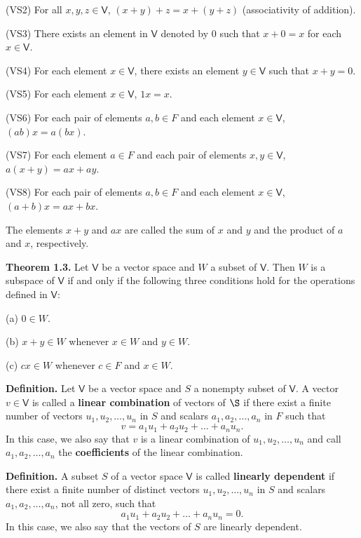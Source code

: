 \documentclass{article}
\newcommand{\0}{\mathit{0}}
\begin{document}
(VS2) For all $x, y, z \in \mathsf{V}$, $(x + y) + z = x + (y + z)$
(associativity of addition).

(VS3) There exists an element in $\mathsf{V}$ denoted by $\0$ such that
$x + \0 = x$ for each $x \in \mathsf{V}$.

(VS4) For each element $x \in \mathsf{V}$, there exists an element
$y \in \mathsf{V}$ such that $x + y = \0$.

(VS5) For each element $x \in \mathsf{V}$, $1x = x$.

(VS6) For each pair of elements $a, b \in F$ and each element
$x \in \mathsf{V}$, $(ab)x = a(bx)$.

(VS7) For each element $a \in F$ and each pair of elements
$x, y \in \mathsf{V}$, $a(x + y) = ax + ay$.

(VS8) For each pair of elements $a, b \in F$ and each element
$x \in \mathsf{V}$, $(a + b)x = ax + bx$.

The elements $x + y$ and $ax$ are called the sum of $x$ and $y$ and the
product of $a$ and $x$, respectively.

\medskip

\textbf{Theorem 1.3.}
Let $\mathsf{V}$ be a vector space and $W$ a subset of
$\mathsf{V}$. Then $W$ is a subspace of $\mathsf{V}$ if and
only if the following three conditions hold for the operations
defined in $\mathsf{V}$:

(a) $\0 \in W$.

(b) $x + y \in W$ whenever $x \in W$ and $y \in W$.

(c) $c x \in W$ whenever $c \in F$ and $x \in W$.

\medskip

\textbf{Definition.}
Let $\mathsf{V}$ be a vector space and $S$ a nonempty subset of
$\mathsf{V}$. A vector $v \in \mathsf{V}$ is called a \textbf{linear combination}
of vectors of $\S$ if there exist a finite number of vectors
$u_1, u_2, \dots, u_n$ in $S$ and scalars $a_1, a_2, \dots, a_n$
in $F$ such that
\[
    v = a_1 u_1 + a_2 u_2 + \dots + a_n u_n.
\]
In this case, we also say that $v$ is a linear combination of
$u_1, u_2, \dots, u_n$ and call $a_1, a_2, \dots, a_n$ the \textbf{coefficients}
of the linear combination.

\medskip

\textbf{Definition.}
A subset $S$ of a vector space $\mathsf{V}$ is called \textbf{linearly
    dependent} if there exist a finite number of distinct vectors
$u_1, u_2, \dots, u_n$ in $S$ and scalars $a_1, a_2, \dots, a_n$,
not all zero, such that
\[
    a_1 u_1 + a_2 u_2 + \dots + a_n u_n = \0.
\]
In this case, we also say that the vectors of $S$ are linearly dependent.
\end{document}
